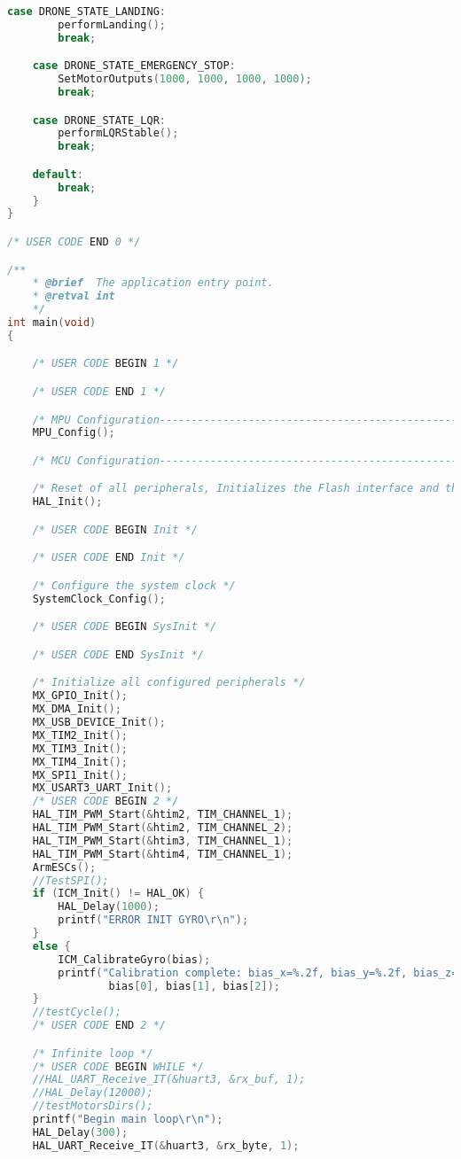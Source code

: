 \begin{lstlisting}[language=C++]
    case DRONE_STATE_LANDING:
        performLanding();
        break;

    case DRONE_STATE_EMERGENCY_STOP:
        SetMotorOutputs(1000, 1000, 1000, 1000);
        break;

    case DRONE_STATE_LQR:
        performLQRStable();
        break;

    default:
        break;
    }
}

/* USER CODE END 0 */

/**
    * @brief  The application entry point.
    * @retval int
    */
int main(void)
{

    /* USER CODE BEGIN 1 */

    /* USER CODE END 1 */

    /* MPU Configuration--------------------------------------------------------*/
    MPU_Config();

    /* MCU Configuration--------------------------------------------------------*/

    /* Reset of all peripherals, Initializes the Flash interface and the Systick. */
    HAL_Init();

    /* USER CODE BEGIN Init */

    /* USER CODE END Init */

    /* Configure the system clock */
    SystemClock_Config();

    /* USER CODE BEGIN SysInit */

    /* USER CODE END SysInit */

    /* Initialize all configured peripherals */
    MX_GPIO_Init();
    MX_DMA_Init();
    MX_USB_DEVICE_Init();
    MX_TIM2_Init();
    MX_TIM3_Init();
    MX_TIM4_Init();
    MX_SPI1_Init();
    MX_USART3_UART_Init();
    /* USER CODE BEGIN 2 */
    HAL_TIM_PWM_Start(&htim2, TIM_CHANNEL_1);
    HAL_TIM_PWM_Start(&htim2, TIM_CHANNEL_2);
    HAL_TIM_PWM_Start(&htim3, TIM_CHANNEL_1);
    HAL_TIM_PWM_Start(&htim4, TIM_CHANNEL_1);
    ArmESCs();
    //TestSPI();
    if (ICM_Init() != HAL_OK) {
        HAL_Delay(1000);
        printf("ERROR INIT GYRO\r\n");
    }
    else {
        ICM_CalibrateGyro(bias);
        printf("Calibration complete: bias_x=%.2f, bias_y=%.2f, bias_z=%.2f deg/s\r\n",
                bias[0], bias[1], bias[2]);
    }
    //testCycle();
    /* USER CODE END 2 */

    /* Infinite loop */
    /* USER CODE BEGIN WHILE */
    //HAL_UART_Receive_IT(&huart3, &rx_buf, 1);
    //HAL_Delay(12000);
    //testMotorsDirs();
    printf("Begin main loop\r\n");
    HAL_Delay(300);
    HAL_UART_Receive_IT(&huart3, &rx_byte, 1);


\end{lstlisting}
